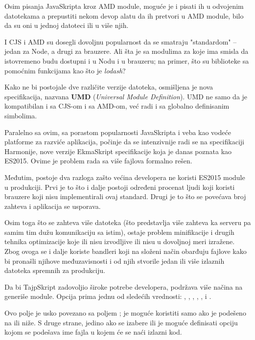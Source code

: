 Osim pisanja JavaSkripta kroz AMD module, moguće je i pisati ih u odvojenim datotekama a prepustiti nekom devop alatu da ih pretvori u AMD module, bilo da su oni u jednoj datoteci ili u više njih.

I CJS i AMD su dosegli dovoljnu popularnost da se smatraju "standardom" -- jedan za Node, a drugi za brauzere.
Ali šta je sa modulima za koje ima smisla da istovremeno budu dostupni i u Nodu i u brauzeru; na primer, što su biblioteke sa pomoćnim funkcijama kao što je \textsl{lodash}?

Kako ne bi postojale dve različite verzije datoteka, osmišljena je nova specifikacija, nazvana \textbf{UMD} (\textsl{Universal Module Definition}).
UMD ne samo da je kompatibilan i sa CJS-om i sa AMD-om, već radi i sa globalno definisanim simbolima.

Paralelno sa ovim, sa porastom popularnosti JavaSkripta i veba kao vodeće platforme za razviće aplikacija, počinje da se intenzivnije radi se na specifikaciji Harmonije, nove verzije EkmaSkript specifikacije koja je danas poznata kao ES2015.
Ovime je problem rada sa više fajlova formalno rešen.

Međutim, postoje dva razloga zašto većina developera ne koristi ES2015 module u produkciji.
Prvi je to što i dalje postoji određeni procenat ljudi koji koristi brauzere koji nisu implementirali ovaj standard.
Drugi je to što se povećava broj zahteva i aplikacija se usporava.

Osim toga što se zahteva više datoteka (što predstavlja više zahteva ka serveru pa samim tim dužu komunikaciju sa istim), ostaje problem minifikacije i drugih tehnika optimizacije koje ili nisu izvodljive ili nisu u dovoljnoj meri izražene.
Zbog ovoga se i dalje koriste bandleri koji na složeni način obarđuju fajlove kako bi pronašli njihove međuzavisnosti i od njih stvorile jedan ili više izlaznih datoteka spremnih za produkciju.

Da bi TajpSkript zadovoljio široke potrebe developera, podržava više načina na generiše module.
Opcija  prima jednu od sledećih vrednosti: , , , , , i .

Ovo polje je usko povezano sa poljem ;  je moguće koristiti samo ako je  podešeno na  ili niže.
S druge strane, jedino ako se izabere  ili  je moguće definisati opciju  kojom se podešava ime fajla u kojem će se naći izlazni kod.

